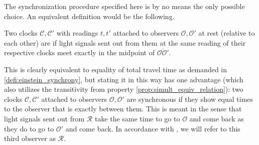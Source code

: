 The synchronization procedure specified here is by no means the only possible choice. An equivalent definition would be the following.
\begin{defi}[Synchronization 2]\label{defi:synchrony_2}
	Two clocks $\mathcal{C}, \mathcal{C}'$ with readings $t, t'$ attached to observers $\mathcal{O}, \mathcal{O}'$ at rest (relative to each other) are  if light signals sent out from them at the same reading of their respective clocks meet exactly in the midpoint of $\overline{\mathcal{O} \mathcal{O}'}$.
\end{defi}
This is clearly equivalent to equality of total travel time as demanded in \ref{defi:einstein_synchrony}, but stating it in this way has one advantage (which also utilizes the transitivity from property \ref{prop:simult_equiv_relation}): two clocks $\mathcal{C}, \mathcal{C}'$ attached to observers $\mathcal{O}, \mathcal{O}'$ are synchronous if they show equal times to the observer that is exactly between them. This is meant in the sense that light signals sent out from $\mathcal{R}$ take the same time to go to $\mathcal{O}$ and come back as they do to go to $\mathcal{O}'$ and come back. In accordance with \cite{dragon_geometry_srt}, we will refer to this third observer as  $\mathcal{R}$.

